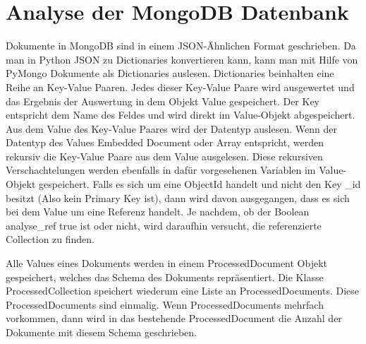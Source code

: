 \section{Analyse der MongoDB Datenbank}
\label{sec:mongoDB_analyse}

Dokumente in MongoDB sind in einem JSON-Ähnlichen Format geschrieben.
Da man in Python JSON zu Dictionaries konvertieren kann, kann man mit Hilfe von PyMongo Dokumente als Dictionaries auslesen.
Dictionaries beinhalten eine Reihe an Key-Value Paaren.
Jedes dieser Key-Value Paare wird ausgewertet und das Ergebnis der Auswertung in dem Objekt Value gespeichert.
Der Key entspricht dem Name des Feldes und wird direkt im Value-Objekt abgespeichert.
Aus dem Value des Key-Value Paares wird der Datentyp auslesen.
Wenn der Datentyp des Values Embedded Document oder Array entspricht, werden rekursiv die Key-Value Paare aus dem Value ausgelesen. 
Diese rekursiven Verschachtelungen werden ebenfalls in dafür vorgesehenen Variablen im Value-Objekt gespeichert.
Falls es sich um eine ObjectId handelt und nicht den Key \_id besitzt (Also kein Primary Key ist), dann wird davon ausgegangen, dass es sich bei dem Value um eine Referenz handelt.
Je nachdem, ob der Boolean analyse\_ref true ist oder nicht, wird daraufhin versucht, die referenzierte Collection zu finden. 

Alle Values eines Dokuments werden in einem ProcessedDocument Objekt gespeichert, welches das Schema des Dokuments repräsentiert.
Die Klasse ProcessedCollection speichert wiederum eine Liste an ProcessedDocuments.
Diese ProcessedDocuments sind einmalig.
Wenn ProcessedDocuments mehrfach vorkommen, dann wird in das bestehende ProcessedDocument die Anzahl der Dokumente mit diesem Schema geschrieben.

